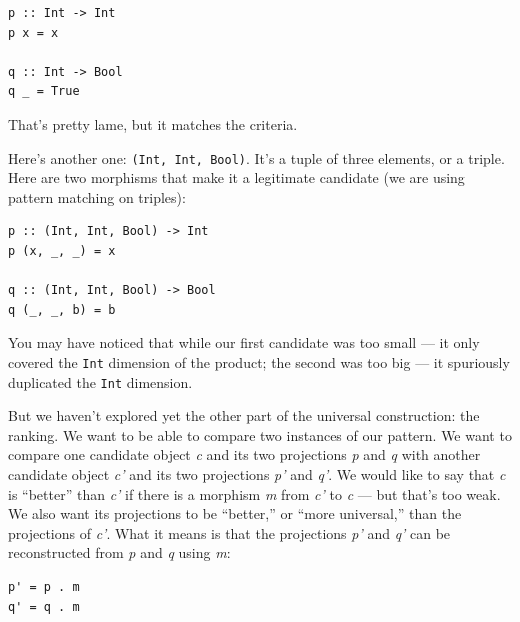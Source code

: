 \begin{verbatim}
p :: Int -> Int
p x = x

q :: Int -> Bool
q _ = True
\end{verbatim}

\noindent
That's pretty lame, but it matches the criteria.

Here's another one: \texttt{(Int, Int, Bool)}. It's a tuple of three
elements, or a triple. Here are two morphisms that make it a legitimate
candidate (we are using pattern matching on triples):

\begin{verbatim}
p :: (Int, Int, Bool) -> Int
p (x, _, _) = x

q :: (Int, Int, Bool) -> Bool
q (_, _, b) = b
\end{verbatim}

\noindent
You may have noticed that while our first candidate was too small --- it
only covered the \texttt{Int} dimension of the product; the second was
too big --- it spuriously duplicated the \texttt{Int} dimension.

But we haven't explored yet the other part of the universal
construction: the ranking. We want to be able to compare two instances
of our pattern. We want to compare one candidate object \emph{c} and its
two projections \emph{p} and \emph{q} with another candidate object
\emph{c'} and its two projections \emph{p'} and \emph{q'}. We would like
to say that \emph{c} is ``better'' than \emph{c'} if there is a morphism
\emph{m} from \emph{c'} to \emph{c} --- but that's too weak. We also
want its projections to be ``better,'' or ``more universal,'' than the
projections of \emph{c'}. What it means is that the projections
\emph{p'} and \emph{q'} can be reconstructed from \emph{p} and \emph{q}
using \emph{m}:

\begin{verbatim}
p' = p . m
q' = q . m
\end{verbatim}

\begin{figure}[H]
  \centering
\end{figure}

